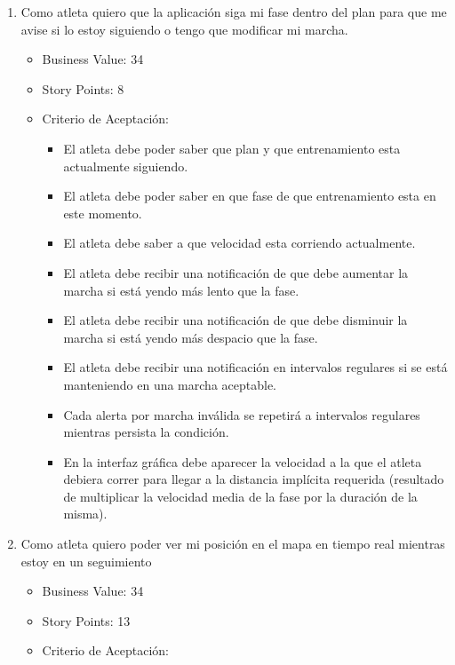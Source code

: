 \begin{enumerate}
\def\labelenumi{\arabic{enumi})}
\item
  Como atleta quiero que la aplicación siga mi fase dentro del plan para
  que me avise si lo estoy siguiendo o tengo que modificar mi marcha.

  \begin{itemize}
  \item
    Business Value: 34
  \item
    Story Points: 8
  \item
    Criterio de Aceptación:

    \begin{itemize}
    \itemsep1pt\parskip0pt
    \item
      El atleta debe poder saber que plan y que entrenamiento esta
      actualmente siguiendo.
    \item
      El atleta debe poder saber en que fase de que entrenamiento esta
      en este momento.
    \item
      El atleta debe saber a que velocidad esta corriendo actualmente.
    \item
      El atleta debe recibir una notificación de que debe aumentar la
      marcha si está yendo más lento que la fase.
    \item
      El atleta debe recibir una notificación de que debe disminuir la
      marcha si está yendo más despacio que la fase.
    \item
      El atleta debe recibir una notificación en intervalos regulares si
      se está manteniendo en una marcha aceptable.
    \item
      Cada alerta por marcha inválida se repetirá a intervalos regulares
      mientras persista la condición.
    \item
      En la interfaz gráfica debe aparecer la velocidad a la que el
      atleta debiera correr para llegar a la distancia implícita
      requerida (resultado de multiplicar la velocidad media de la fase
      por la duración de la misma).
    \end{itemize}
  \end{itemize}
\item
  Como atleta quiero poder ver mi posición en el mapa en tiempo real
  mientras estoy en un seguimiento

  \begin{itemize}
  \itemsep1pt\parskip0pt
  \item
    Business Value: 34
  \item
    Story Points: 13
  \item
    Criterio de Aceptación:


\end{itemize}
\end{enumerate}
